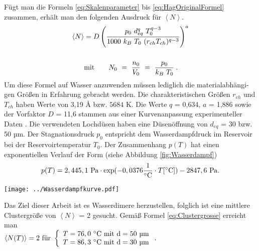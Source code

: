Fügt man die Formeln \ref{eq:Skalenparameter} bis \ref{eq:HagOriginalFormel} zusammen, erhält man den folgenden Ausdruck für $\left\langle N \right\rangle $.
\begin{equation}
	\begin{split}
	\left\langle N \right\rangle & = D \left( \frac{p_0\ d_{eq}^q \ T_0^{q-3}}{1000\ k_B\ T_0\ (r_{ch}T_{ch})^{q-3}}\right)^a \\ \\
	& \textmd{mit} \qquad N_0\  =\ \frac{n_0}{V_0}\ =\ \frac{p_0}{k_B\ T_0} \: .
	\end{split}
\end{equation}
Um diese Formel auf Wasser anzuwenden müssen lediglich die materialabhängi-gen Größen in Erfahrung gebracht werden. Die charakteristischen Größen $r_{ch}$ und $T_{ch}$ haben Werte von 3,19 \AA{} bzw. $5684$ K. Die Werte $q$ = 0,634, $a$ = 1,886 sowie der Vorfaktor $D$ = 11,6 stammen aus einer Kurvenanpassung experimenteller Daten \cite{bobbert2002}. Die verwendeten Lochdüsen haben eine Düsenöffnung von $d_{eq}$ = 30 bzw. 50 µm. Der Stagnationsdruck $p_0$ entspricht dem Wasserdampfdruck im Reservoir bei der Reservoirtemperatur $T_0$. Der Zusammenhang $p(T)$ hat einen exponentiellen Verlauf der Form (siehe Abbildung \ref{fig:Wasserdampf})
\begin{equation} \label{eq:Clustergrosse}
p(T) = 2,445,1\ \textmd{Pa} \cdot \textmd{exp}(-0,0376 \frac{1}{^{\circ} \textmd{C}} \cdot T [^{\circ} \textmd{C}]) - 2847,6\ \textmd{Pa} .
\end{equation}
\begin{center}
\begin{minipage}{\linewidth}
\centering
\texttt{[image: ../Wasserdampfkurve.pdf]}%
 \label{fig:Wasserdampf}
\end{minipage} 
\end{center}
Das Ziel dieser Arbeit ist es Wasserdimere herzustellen, folglich ist eine mittlere Clustergröße von $\left \langle N \right\rangle$ = 2 gesucht. Gemäß Formel \ref{eq:Clustergrosse} erreicht man \\ $\left \langle N(T) \right\rangle = 2 \textmd{ für }
\left\{ %
   \begin{array}{l}
   T = 76,0\ ^{\circ} \textmd{C} \textmd{ mit d}= 50 \textmd{ µm} \\ 
   T = 86,3\ ^{\circ} \textmd{C} \textmd{ mit d}= 30 \textmd{ µm}
   \end{array}
   \right. .$\\ \\